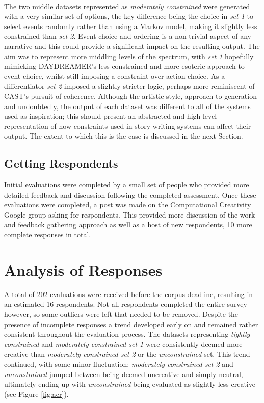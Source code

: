 \documentclass[letterpaper]{article}
\begin{document}
\\The two middle datasets represented as \emph{moderately constrained} were generated with a very similar set of options, the key difference being the choice in \emph{set 1} to select events randomly rather than using a Markov model, making it slightly less constrained than \emph{set 2}. Event choice and ordering is a non trivial aspect of any narrative and this could provide a significant impact on the resulting output. The aim was to represent more middling levels of the spectrum, with \emph{set 1} hopefully mimicking DAYDREAMER's less constrained and more esoteric approach to event choice, whilst still imposing a constraint over action choice. As a differentiator \emph{set 2} imposed a slightly stricter logic, perhaps more reminiscent of CAST's pursuit of coherence. Although the artistic style, approach to generation and undoubtedly, the output of each dataset was different to all of the systems used as inspiration; this should present an abstracted and high level representation of how constraints used in story writing systems can affect their output. The extent to which this is the case is discussed in the next Section.

\subsection{Getting Respondents}
Initial evaluations were completed by a small set of people who provided more detailed feedback and discussion following the completed assessment. Once these evaluations were completed, a post was made on the Computational Creativity Google group asking for respondents. This provided more discussion of the work and feedback gathering approach as well as a host of new respondents, 10 more complete responses in total. 

\section{Analysis of Responses}
A total of 202 evaluations were received before the corpus deadline, resulting in an estimated 16 respondents. Not all respondents completed the entire survey however, so some outliers were left that needed to be removed. 
Despite the presence of incomplete responses a trend developed early on and remained rather consistent throughout the evaluation process. The datasets representing \emph{tightly constrained} and \emph{moderately constrained set 1} were consistently deemed more creative than \emph{moderately constrained set 2} or the \emph{unconstrained} set. This trend continued, with some minor fluctuation; \emph{moderately constrained set 2} and \emph{unconstrained} jumped between being deemed uncreative and simply neutral,  ultimately ending up with \emph{unconstrained} being evaluated as slightly less creative (see Figure \ref{fig:acr}). 
\end{document}
